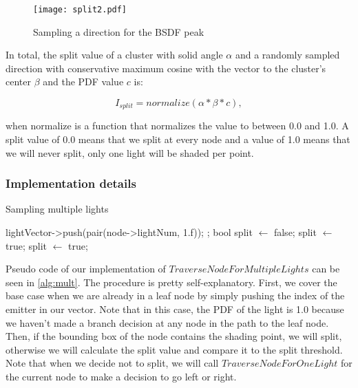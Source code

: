 \begin{figure}
	\begin{center}
		\texttt{[image: split2.pdf]}
		\caption{Sampling a direction for the BSDF peak}
		\label{fig:split2}
	\end{center}
\end{figure}

In total, the split value of a cluster with solid angle $\alpha$ and a randomly sampled direction with conservative maximum cosine with the vector to the cluster's center $\beta$ and the PDF value $c$ is:

\begin{equation}
I_{split} = normalize(\alpha * \beta * c),
\end{equation}

when normalize is a function that normalizes the value to between 0.0 and 1.0. A split value of 0.0 means that we split at every node and a value of 1.0 means that we will never split, only one light will be shaded per point.

\newpage

\subsubsection{Implementation details}

\begin{algorithm}
	\caption{Sampling multiple lights}
	\label{alg:mult}
\begin{algorithmic}[1] %
	\State lightVector->push(pair(node->lightNum, 1.f));
	\State \Return;
	\EndIf
	\State bool split $\gets$ false;
	\State split $\gets$ true;
	\Else
	\State <approximate solid angle>
	\State <sample random direction and calculate BSDF peak>
	\State <calculate normalized split value>
	\State split $\gets$ true;
	\EndIf
	\EndIf
	\State <recursively traverse left and right child>
	\Else
	\State <call TraverseNodeForOneLight for current node and store return in vector>
	\EndIf
	\EndProcedure
\end{algorithmic}
\end{algorithm}

Pseudo code of our implementation of $TraverseNodeForMultipleLights$ can be seen in \ref{alg:mult}. The procedure is pretty self-explanatory. First, we cover the base case when we are already in a leaf node by simply pushing the index of the emitter in our vector. Note that in this case, the PDF of the light is 1.0 because we haven't made a branch decision at any node in the path to the leaf node. Then, if the bounding box of the node contains the shading point, we will split, otherwise we will calculate the split value and compare it to the split threshold. Note that when we decide not to split, we will call $TraverseNodeForOneLight$ for the current node to make a decision to go left or right. 

